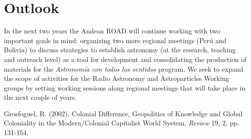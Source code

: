 \documentclass{iau}
\begin{document}
\section{Outlook}
In the next two years the Andean ROAD will continue working with two
important goals in mind: organizing two more regional meetings (Per\'u
and Bolivia) to discuss strategies to establish astronomy (at the research,
teaching and outreach level) as a tool for development and
consolidating the production of materials for the \emph{Astronom\'ia
  con todos los sentidos} program. 
We seek to expand the scope of  activities for the Radio Astronomy and
Astroparticles Working groups  by setting working sessions along
regional meetings that will take place in the next couple of years.

\begin{thebibliography}{}

{Grosfoguel, R. (2002)}, {Colonial Difference, Geopolitics of Knowledge
  and Global Coloniality 
  in the Modern/Colonial Capitalist World System}, 
\textit{Review} 19, 2, pp. 131-154.


\end{thebibliography}
\end{document}
